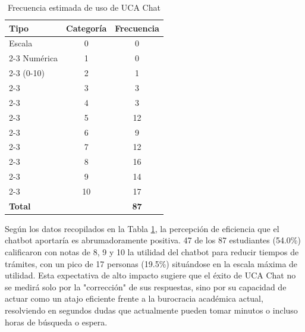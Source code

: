 {{\begin{table}[H]
    \centering
    \caption{Frecuencia estimada de uso de UCA Chat}
    \begin{tabular}{|l|c|c|}
        \hline
        \textbf{Tipo} & \textbf{Categoría} & \textbf{Frecuencia} \\ \hline
        Escala & 0 & 0 \\ \cline{2-3} 
        Numérica & 1 & 0 \\ \cline{2-3} 
        (0-10) & 2 & 1 \\ \cline{2-3} 
         & 3 & 3 \\ \cline{2-3} 
         & 4 & 3 \\ \cline{2-3} 
         & 5 & 12 \\ \cline{2-3} 
         & 6 & 9 \\ \cline{2-3} 
         & 7 & 12 \\ \cline{2-3} 
         & 8 & 16 \\ \cline{2-3} 
         & 9 & 14 \\ \cline{2-3} 
         & 10 & 17 \\ \hline
        \textbf{Total} & \multicolumn{1}{c|}{} & \textbf{87} \\ \hline
    \end{tabular}
    \label{tab:reduccion_tiempo_tramites}
\end{table}

Según los datos recopilados en la Tabla \ref{tab:reduccion_tiempo_tramites}, la percepción de eficiencia que el chatbot aportaría es abrumadoramente positiva. 47 de los 87 estudiantes (54.0\%) calificaron con notas de 8, 9 y 10 la utilidad del chatbot para reducir tiempos de trámites, con un pico de 17 personas (19.5\%) situándose en la escala máxima de utilidad. Esta expectativa de alto impacto sugiere que el éxito de UCA Chat no se medirá solo por la "corrección" de sus respuestas, sino por su capacidad de actuar como un atajo eficiente frente a la burocracia académica actual, resolviendo en segundos dudas que actualmente pueden tomar minutos o incluso horas de búsqueda o espera.






        }

}


